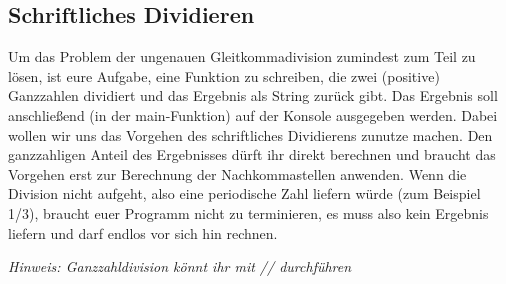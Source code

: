 \subsection{Schriftliches Dividieren }
Um das Problem der ungenauen Gleitkommadivision zumindest zum Teil zu lösen, ist eure Aufgabe, eine Funktion zu schreiben, die zwei (positive) Ganzzahlen dividiert und das Ergebnis als String zurück gibt. Das Ergebnis soll anschließend (in der main-Funktion) auf der Konsole ausgegeben werden. Dabei wollen wir uns das Vorgehen des schriftliches Dividierens zunutze machen. Den ganzzahligen Anteil des Ergebnisses dürft ihr direkt berechnen und braucht das Vorgehen erst zur Berechnung der Nachkommastellen anwenden. Wenn die Division nicht aufgeht, also eine periodische Zahl liefern würde (zum Beispiel 1/3), braucht euer Programm nicht zu terminieren, es muss also kein Ergebnis liefern und darf endlos vor sich hin rechnen.

\textit{Hinweis: Ganzzahldivision könnt ihr mit // durchführen}
